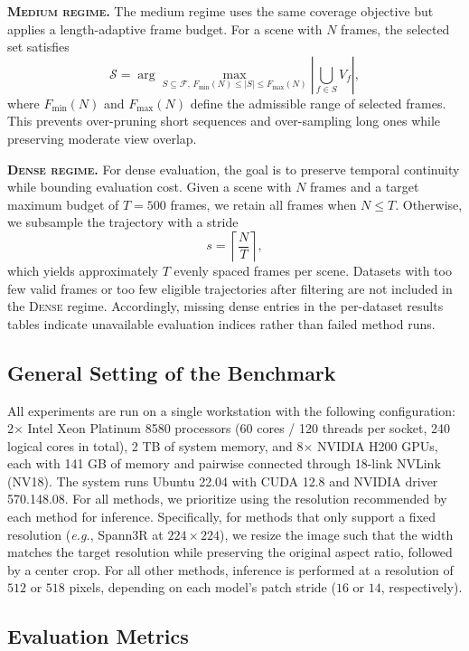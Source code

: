 \documentclass{llmxive}
\begin{document}
\textbf{\textsc{Medium regime.}}
The medium regime uses the same coverage objective but applies a length-adaptive frame budget.
For a scene with $N$ frames, the selected set satisfies
\[
\mathcal{S}
=
\arg\max_{S \subseteq \mathcal{F},\, F_{\min}(N) \le |S| \le F_{\max}(N)}
\left|
\bigcup_{f \in S} V_f
\right|,
\]
where $F_{\min}(N)$ and $F_{\max}(N)$ define the admissible range of selected frames.
This prevents over-pruning short sequences and over-sampling long ones while preserving moderate view overlap.

\textbf{\textsc{Dense regime.}}
For dense evaluation, the goal is to preserve temporal continuity while bounding evaluation cost.
%
Given a scene with $N$ frames and a target maximum budget of $T=500$ frames, we retain all frames when $N \le T$.
Otherwise, we subsample the trajectory with a stride
\[
s = \left\lceil \frac{N}{T} \right\rceil,
\]
which yields approximately $T$ evenly spaced frames per scene.
Datasets with too few valid frames or too few eligible trajectories after filtering are not included in the \textsc{Dense} regime.
%
Accordingly, missing dense entries in the per-dataset results tables indicate unavailable evaluation indices rather than failed method runs.

\subsection{General Setting of the Benchmark}
All experiments are run on a single workstation with the following configuration: 2$\times$ Intel Xeon Platinum 8580 processors (60 cores / 120 threads per socket, 240 logical cores in total), 2 TB of system memory, and 8$\times$ NVIDIA H200 GPUs, each with 141 GB of memory and pairwise connected through 18-link NVLink (NV18). 
%
The system runs Ubuntu 22.04 with CUDA 12.8 and NVIDIA driver 570.148.08.
%
For all methods, we prioritize using the resolution recommended by each method for inference.
%
Specifically, for methods that only support a fixed resolution (\emph{e.g.}, Spann3R at $224 \times 224$), we resize the image such that the width matches the target resolution while preserving the original aspect ratio, followed by a center crop. For all other methods, inference is performed at a resolution of $512$ or $518$ pixels, depending on each model's patch stride ($16$ or $14$, respectively).



\subsection{Evaluation Metrics}
\label{appendix:metrics}
\end{document}
